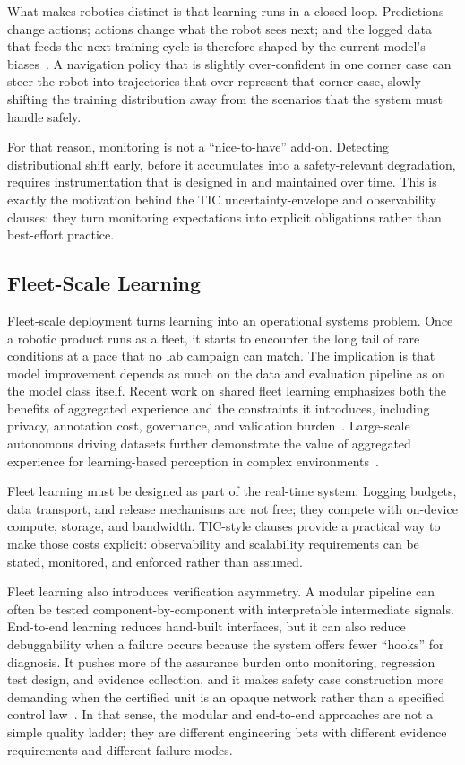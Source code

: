 \documentclass[smallextended]{svjour3}
\begin{document}
What makes robotics distinct is that learning runs in a closed loop. Predictions change actions; actions change what the robot sees next; and the logged data that feeds the next training cycle is therefore shaped by the current model's biases~\cite{ross2011}.
A navigation policy that is slightly over-confident in one corner case can steer the robot into trajectories that over-represent that corner case, slowly shifting the training distribution away from the scenarios that the system must handle safely.

For that reason, monitoring is not a ``nice-to-have'' add-on. Detecting distributional shift early, before it accumulates into a safety-relevant degradation, requires instrumentation that is designed in and maintained over time. This is exactly the motivation behind the TIC uncertainty-envelope and observability clauses: they turn monitoring expectations into explicit obligations rather than best-effort practice.

\subsection{Fleet-Scale Learning}

Fleet-scale deployment turns learning into an operational systems problem. Once a
robotic product runs as a fleet, it starts to encounter the long tail of rare
conditions at a pace that no lab campaign can match. The implication is that model
improvement depends as much on the data and evaluation pipeline as on the model class
itself. Recent work on shared fleet learning emphasizes both the
benefits of aggregated experience and the constraints it
introduces, including privacy, annotation cost, governance,
and validation burden~\cite{retory2021federated}.
Large-scale autonomous driving datasets further demonstrate
the value of aggregated experience for learning-based
perception in complex environments~\cite{sun2020waymo}.

Fleet learning must be designed as part of the real-time system. Logging budgets, data transport, and release mechanisms are not free; they compete with on-device compute, storage, and bandwidth. TIC-style clauses provide a practical way to make those costs explicit: observability and scalability requirements can be stated, monitored, and enforced rather than assumed.

Fleet learning also introduces verification asymmetry. A modular pipeline can often be tested component-by-component with interpretable intermediate signals. End-to-end learning reduces hand-built interfaces, but it can also reduce debuggability when a
failure occurs because the system offers fewer ``hooks'' for diagnosis. It pushes more of the assurance burden onto monitoring, regression test design, and evidence collection, and it makes safety case construction more demanding when the certified unit is an opaque network rather than a specified control law~\cite{seshia2022,brunke2022}. In that sense, the modular and end-to-end approaches are not a simple quality ladder;
they are different engineering bets with different evidence requirements and different failure modes.
\end{document}
